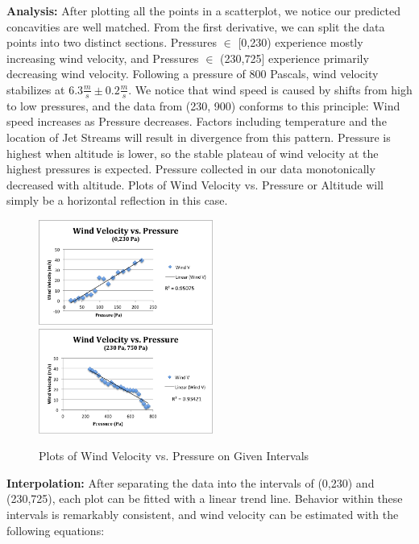 \documentclass{article}
\begin{document}
\begin{flushleft}
\textbf{Analysis:} After plotting all the points in a scatterplot, we notice our predicted concavities are well matched.  From the first derivative, we can split the data points into two distinct sections.  Pressures $\in$ [0,230) experience mostly increasing wind velocity, and Pressures $\in$ (230,725] experience primarily decreasing wind velocity.  Following a pressure of 800 Pascals, wind velocity stabilizes at $6.3\frac{m}{s} \pm 0.2\frac{m}{s}$.  We notice that wind speed is caused by shifts from high to low pressures, and the data from (230, 900) conforms to this principle: Wind speed increases as Pressure decreases.  Factors including temperature and the location of Jet Streams will result in divergence from this pattern.  Pressure is highest when altitude is lower, so the stable plateau of wind velocity at the highest pressures is expected.  Pressure collected in our data monotonically decreased with altitude.  Plots of Wind Velocity vs. Pressure or Altitude will simply be a horizontal reflection in this case.
\end{flushleft}

\begin{figure}[H]
\centering
\includegraphics[width=2.25in]{LPANDA.png}\hfill \includegraphics[width=2.25in]{RPANDA.png}
\caption{Plots of Wind Velocity vs. Pressure on Given Intervals}
\end{figure}

\begin{flushleft}
\textbf{Interpolation:} After separating the data into the intervals of (0,230) and (230,725), each plot can be fitted with a linear trend line.  Behavior within these intervals is remarkably consistent, and wind velocity can be estimated with the following equations:
\end{flushleft}
\end{document}
